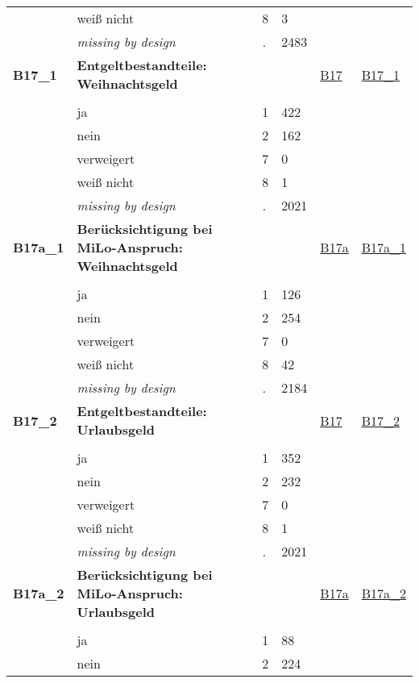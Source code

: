 \begin{longtable}{| L{2.45cm} | L{6cm} | C{1.5cm} | R{1cm} | C{2.25cm} | C{2.25cm} |}
   & weiß nicht & 8 & 3 &  &  \\ 
   & \textit{missing by design} & \textit{.} & 2483 &  &  \\ 
   \midrule
\textbf{B17\_1}\label{var:B17:1} & \textbf{Entgeltbestandteile: Weihnachtsgeld} &  &  & \hyperref[B17]{B17} & \hyperref[var:suf:B17:1]{B17\_1} \\ 
   &  &  &  &  &  \\ 
   & ja & 1 & 422 &  &  \\ 
   & nein & 2 & 162 &  &  \\ 
   & verweigert & 7 & 0 &  &  \\ 
   & weiß nicht & 8 & 1 &  &  \\ 
   & \textit{missing by design} & \textit{.} & 2021 &  &  \\ 
   \midrule
\textbf{B17a\_1}\label{var:B17a:1} & \textbf{Berücksichtigung bei MiLo-Anspruch: Weihnachtsgeld} &  &  & \hyperref[B17a]{B17a} & \hyperref[var:suf:B17a:1]{B17a\_1} \\ 
   &  &  &  &  &  \\ 
   & ja & 1 & 126 &  &  \\ 
   & nein & 2 & 254 &  &  \\ 
   & verweigert & 7 & 0 &  &  \\ 
   & weiß nicht & 8 & 42 &  &  \\ 
   & \textit{missing by design} & \textit{.} & 2184 &  &  \\ 
   \midrule
\textbf{B17\_2}\label{var:B17:2} & \textbf{Entgeltbestandteile: Urlaubsgeld} &  &  & \hyperref[B17]{B17} & \hyperref[var:suf:B17:2]{B17\_2} \\ 
   &  &  &  &  &  \\ 
   & ja & 1 & 352 &  &  \\ 
   & nein & 2 & 232 &  &  \\ 
   & verweigert & 7 & 0 &  &  \\ 
   & weiß nicht & 8 & 1 &  &  \\ 
   & \textit{missing by design} & \textit{.} & 2021 &  &  \\ 
   \midrule
\textbf{B17a\_2}\label{var:B17a:2} & \textbf{Berücksichtigung bei MiLo-Anspruch: Urlaubsgeld} &  &  & \hyperref[B17a]{B17a} & \hyperref[var:suf:B17a:2]{B17a\_2} \\ 
   &  &  &  &  &  \\ 
   & ja & 1 & 88 &  &  \\ 
   & nein & 2 & 224 &  &  \\ 

\end{longtable}
